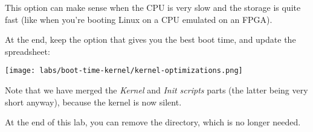 This option can make sense when the CPU is very slow and the storage is
quite fast (like when you're booting Linux on a CPU emulated on an FPGA).

At the end, keep the option that gives you the best boot time, and
update the 
spreadsheet:

\texttt{[image: labs/boot-time-kernel/kernel-optimizations.png]}

Note that we have merged the {\em Kernel} and {\em Init scripts} parts
(the latter being very short anyway), because the kernel is now silent.

At the end of this lab, you can remove the 
directory, which is no longer needed.
